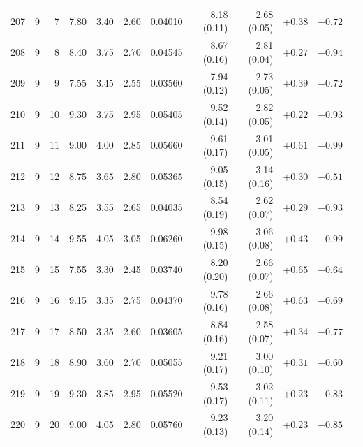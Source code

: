 \begin{longtable}{@{}rrrrrrrrrrrr@{}}
207 & 9 & 7 & \num{7.80} & \num{3.40} & \num{2.60} & \num{0.04010} & \num{8.18} (\num{0.11}) & \num{2.68} (\num{0.05}) & $+\num{0.38}$ & $-\num{0.72}$ &  \\
208 & 9 & 8 & \num{8.40} & \num{3.75} & \num{2.70} & \num{0.04545} & \num{8.67} (\num{0.16}) & \num{2.81} (\num{0.04}) & $+\num{0.27}$ & $-\num{0.94}$ &  \\
209 & 9 & 9 & \num{7.55} & \num{3.45} & \num{2.55} & \num{0.03560} & \num{7.94} (\num{0.12}) & \num{2.73} (\num{0.05}) & $+\num{0.39}$ & $-\num{0.72}$ &  \\
210 & 9 & 10 & \num{9.30} & \num{3.75} & \num{2.95} & \num{0.05405} & \num{9.52} (\num{0.14}) & \num{2.82} (\num{0.05}) & $+\num{0.22}$ & $-\num{0.93}$ &  \\
211 & 9 & 11 & \num{9.00} & \num{4.00} & \num{2.85} & \num{0.05660} & \num{9.61} (\num{0.17}) & \num{3.01} (\num{0.05}) & $+\num{0.61}$ & $-\num{0.99}$ &  \\
212 & 9 & 12 & \num{8.75} & \num{3.65} & \num{2.80} & \num{0.05365} & \num{9.05} (\num{0.15}) & \num{3.14} (\num{0.16}) & $+\num{0.30}$ & $-\num{0.51}$ &  \\
213 & 9 & 13 & \num{8.25} & \num{3.55} & \num{2.65} & \num{0.04035} & \num{8.54} (\num{0.19}) & \num{2.62} (\num{0.07}) & $+\num{0.29}$ & $-\num{0.93}$ &  \\
214 & 9 & 14 & \num{9.55} & \num{4.05} & \num{3.05} & \num{0.06260} & \num{9.98} (\num{0.15}) & \num{3.06} (\num{0.08}) & $+\num{0.43}$ & $-\num{0.99}$ &  \\
215 & 9 & 15 & \num{7.55} & \num{3.30} & \num{2.45} & \num{0.03740} & \num{8.20} (\num{0.20}) & \num{2.66} (\num{0.07}) & $+\num{0.65}$ & $-\num{0.64}$ &  \\
216 & 9 & 16 & \num{9.15} & \num{3.35} & \num{2.75} & \num{0.04370} & \num{9.78} (\num{0.16}) & \num{2.66} (\num{0.08}) & $+\num{0.63}$ & $-\num{0.69}$ &  \\
217 & 9 & 17 & \num{8.50} & \num{3.35} & \num{2.60} & \num{0.03605} & \num{8.84} (\num{0.16}) & \num{2.58} (\num{0.07}) & $+\num{0.34}$ & $-\num{0.77}$ &  \\
218 & 9 & 18 & \num{8.90} & \num{3.60} & \num{2.70} & \num{0.05055} & \num{9.21} (\num{0.17}) & \num{3.00} (\num{0.10}) & $+\num{0.31}$ & $-\num{0.60}$ &  \\
219 & 9 & 19 & \num{9.30} & \num{3.85} & \num{2.95} & \num{0.05520} & \num{9.53} (\num{0.17}) & \num{3.02} (\num{0.11}) & $+\num{0.23}$ & $-\num{0.83}$ &  \\
220 & 9 & 20 & \num{9.00} & \num{4.05} & \num{2.80} & \num{0.05760} & \num{9.23} (\num{0.13}) & \num{3.20} (\num{0.14}) & $+\num{0.23}$ & $-\num{0.85}$ &  \\

\end{longtable}
